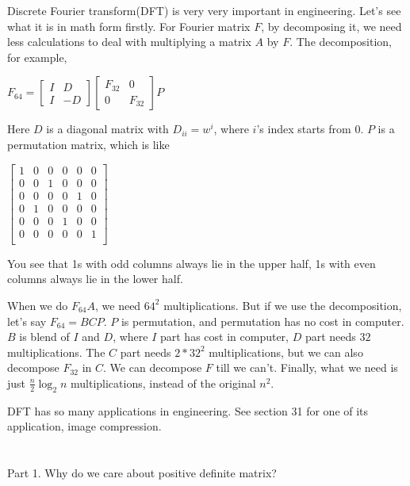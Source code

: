 \documentclass{article}
\begin{document}
\begin{spacing}{1.5}
Discrete Fourier transform(DFT) is very very important in engineering. Let's see what it is in math form firstly. For Fourier matrix $F$, by decomposing it, we need less calculations to deal with multiplying a matrix $A$ by $F$. The decomposition, for example, 
\begin{center}
	$ F_{64}={
		\begin{bmatrix}
		I & D \\
		I & -D
		\end{bmatrix}}
		\begin{bmatrix}
		F_{32} & 0 \\
		0 & F_{32}
		\end{bmatrix}
		P
	$
\end{center}
Here $D$ is a diagonal matrix with $D_{ii}=w^{i}$, where $i$'s index starts from 0. $P$ is a permutation matrix, which is like
\begin{center}
	$\begin{bmatrix}
	1 & 0 & 0 &  0 & 0 & 0 \\
	0 & 0 & 1 &  0 & 0 & 0 \\
	0 & 0 & 0 &  0 & 1 & 0 \\
	0 & 1 & 0 &  0 & 0 & 0 \\
	0 & 0 & 0 &  1 & 0 & 0 \\
	0 & 0 & 0 &  0 & 0 & 1 \\
	\end{bmatrix}$
\end{center}
You see that 1s with odd columns always lie in the upper half, 1s with even columns always lie in the lower half. 

When we do $F_{64}A$, we need $64^2$ multiplications. But if we use the decomposition, let's say $F_{64}=BCP$. $P$ is permutation, and permutation has no cost in computer. $B$ is blend of $I$ and $D$, where $I$ part has cost in computer, $D$ part needs $32$ multiplications. The $C$ part needs $2*32^2$ multiplications, but we can also decompose $F_{32}$ in $C$. We can decompose $F$ till we can't. Finally, what we need is just $\frac{n}{2}\log_2 n$ multiplications, instead of the original $n^2$. 

DFT has so many applications in engineering. See section 31 for one of its application, image compression.

\section{}
Part 1. Why do we care about positive definite matrix?


\end{spacing}
\end{document}

